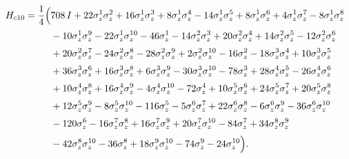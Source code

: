 \begin{equation}
\begin{aligned}
H_{c10}= \frac14\Bigl(&
 708\,I
+ 22\sigma_{z}^{1}\sigma_{z}^{2}
+ 16\sigma_{z}^{1}\sigma_{z}^{3}
+  8\sigma_{z}^{1}\sigma_{z}^{4}
- 14\sigma_{z}^{1}\sigma_{z}^{5}
+  8\sigma_{z}^{1}\sigma_{z}^{6}
+  4\sigma_{z}^{1}\sigma_{z}^{7}
-  8\sigma_{z}^{1}\sigma_{z}^{8} \\[2pt]
&{}- 10\sigma_{z}^{1}\sigma_{z}^{9}
- 22\sigma_{z}^{1}\sigma_{z}^{10}
- 46\sigma_{z}^{1}
- 14\sigma_{z}^{2}\sigma_{z}^{3}
+ 20\sigma_{z}^{2}\sigma_{z}^{4}
+ 14\sigma_{z}^{2}\sigma_{z}^{5}
- 12\sigma_{z}^{2}\sigma_{z}^{6} \\[2pt]
&{}+ 20\sigma_{z}^{2}\sigma_{z}^{7}
- 24\sigma_{z}^{2}\sigma_{z}^{8}
- 28\sigma_{z}^{2}\sigma_{z}^{9}
+  2\sigma_{z}^{2}\sigma_{z}^{10}
- 16\sigma_{z}^{2}
- 18\sigma_{z}^{3}\sigma_{z}^{4}
+ 10\sigma_{z}^{3}\sigma_{z}^{5} \\[2pt]
&{}+ 36\sigma_{z}^{3}\sigma_{z}^{6}
+ 16\sigma_{z}^{3}\sigma_{z}^{8}
+  6\sigma_{z}^{3}\sigma_{z}^{9}
- 30\sigma_{z}^{3}\sigma_{z}^{10}
- 78\sigma_{z}^{3}
+ 28\sigma_{z}^{4}\sigma_{z}^{5}
- 26\sigma_{z}^{4}\sigma_{z}^{6} \\[2pt]
&{}+ 10\sigma_{z}^{4}\sigma_{z}^{8}
+ 16\sigma_{z}^{4}\sigma_{z}^{9}
-  4\sigma_{z}^{4}\sigma_{z}^{10}
- 72\sigma_{z}^{4}
+ 10\sigma_{z}^{5}\sigma_{z}^{6}
+ 24\sigma_{z}^{5}\sigma_{z}^{7}
+ 20\sigma_{z}^{5}\sigma_{z}^{8} \\[2pt]
&{}+ 12\sigma_{z}^{5}\sigma_{z}^{9}
-  8\sigma_{z}^{5}\sigma_{z}^{10}
- 116\sigma_{z}^{5}
-  5\sigma_{z}^{6}\sigma_{z}^{7}
+ 22\sigma_{z}^{6}\sigma_{z}^{8}
-  6\sigma_{z}^{6}\sigma_{z}^{9}
- 36\sigma_{z}^{6}\sigma_{z}^{10} \\[2pt]
&{}- 120\sigma_{z}^{6}
- 16\sigma_{z}^{7}\sigma_{z}^{8}
+ 16\sigma_{z}^{7}\sigma_{z}^{9}
+ 20\sigma_{z}^{7}\sigma_{z}^{10}
-  84\sigma_{z}^{7}
+ 34\sigma_{z}^{8}\sigma_{z}^{9} \\[2pt]
&{}- 42\sigma_{z}^{8}\sigma_{z}^{10}
- 36\sigma_{z}^{8}
+ 18\sigma_{z}^{9}\sigma_{z}^{10}
- 74\sigma_{z}^{9}
- 24\sigma_{z}^{10}
\Bigr).
\end{aligned}
\end{equation}

